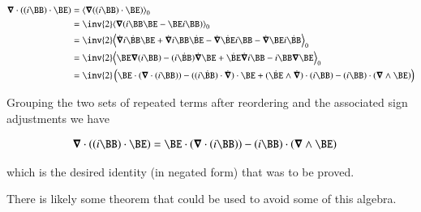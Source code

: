 \documentclass{article}
\begin{document}
\begin{align*}
\spacegrad \cdot ((i \BB) \cdot \BE)
&= \gpgradezero{ \spacegrad ((i \BB) \cdot \BE)} \\
&= \inv{2} \gpgradezero{ \spacegrad ( i \BB \BE - \BE i \BB ) } \\
&= \inv{2} \gpgradezero{ 
  \dot{\spacegrad} i \dot{\BB} \BE 
+ \dot{\spacegrad} i \BB \dot{\BE}
- \dot{\spacegrad} \dot{\BE} i \BB 
- \dot{\spacegrad} \BE i \dot{\BB}
} \\
&= \inv{2} \gpgradezero{ 
  \BE \spacegrad (i \BB) - (i\dot{\BB}) \dot{\spacegrad} \BE
+ \dot{\BE} \dot{\spacegrad} i \BB - i \BB \spacegrad \BE
} \\
&= \inv{2} \left(
  \BE \cdot (\spacegrad \cdot (i \BB)) - ((i\dot{\BB}) \cdot \dot{\spacegrad}) \cdot \BE
+ (\dot{\BE} \wedge \dot{\spacegrad}) \cdot (i \BB) - (i \BB) \cdot (\spacegrad \wedge \BE) 
\right)
\\
\end{align*}

Grouping the two sets of repeated terms after reordering and the associated sign adjustments we have

\begin{align}\label{eqn:poyntingDivergence}
\spacegrad \cdot ((i \BB) \cdot \BE) &= \BE \cdot (\spacegrad \cdot (i \BB)) - (i \BB) \cdot (\spacegrad \wedge \BE)
\end{align}

which is the desired identity (in negated form) that was to be proved.

There is likely some theorem that could be used to avoid some of this algebra.



\end{document}
